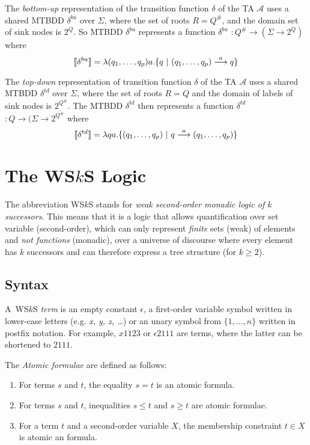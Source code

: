 The \emph{bottom-up} representation of the transition function $\delta$ of the TA $\mathcal{A}$ uses a shared MTBDD $\delta^{bu}$ over $\Sigma$, where the set of roots $R = Q^\#$, and the domain set of sink nodes is $2^Q$. So MTBDD $\delta^{bu}$ represents a function \textlbrackdbl $\delta^{bu}$ \textrbrackdbl $: Q^\# \rightarrow (\Sigma \rightarrow 2^Q)$ where
 \begin{equation}
  \text{\textlbrackdbl} \delta^{bu} \text{\textrbrackdbl} =
 \lambda (q_1,\ldots,q_p) a . \{q\ |\ (q_1,\ldots,q_p) \overset{a}{\longrightarrow} q\}
 \end{equation}

The \emph{top-down} representation of transition function $\delta$ of the TA $\mathcal{A}$ uses a shared MTBDD $\delta^{td}$ over $\Sigma$, where the set of roots $R = Q$ and the domain of labels of sink nodes is $2^{Q^\#}$. The MTBDD $\delta^{td}$ then represents a function \textlbrackdbl $\delta^{td}$ \textrbrackdbl $: Q \rightarrow (\Sigma \rightarrow 2^{Q^\#}$ where 
\begin{equation} \text{\textlbrackdbl} \delta^{td} \text{\textrbrackdbl} =
\lambda q a .
\{(q_1,\ldots,q_p)\ |\ q \overset{a}{\longrightarrow} (q_1,\ldots,q_p)\}
\end{equation}

\chapter{The WS$k$S Logic}\label{wsks}
The abbreviation WS$k$S stands for \emph{weak second-order monadic logic of $k$
successors}. This means that it is a logic that allows quantification over set variable (second-order), which can only represent \emph{finite} sets (weak) of elements and \emph{not functions} (monadic), over a universe of discourse where every element has $k$ successors and can therefore express a tree structure (for $k \geq 2$).
 
 \section{Syntax}
 A~WS$k$S \emph{term} is an empty constant $\epsilon$, a first-order variable symbol written in lower-case letters (e.g. \emph{x, y, z,
 \ldots}) or an unary symbol from $\{1,\ldots,n\}$ written in postfix notation.
 For example, $x1123$ or $\epsilon2111$ are terms, where the latter can be shortened to $2111$.

The \emph{Atomic formulae} are defined as follows:
 \begin{enumerate}
  \item For terms $s$ and $t$, the equality $s = t$ is an atomic formula.
	\item For terms $s$ and $t$, inequalities $s \leq t$ and $s \geq t$ are atomic formulae.
	\item For a term $t$ and a second-order variable $X$, the membership constraint $t \in X$ is atomic an formula.
 \end{enumerate}

